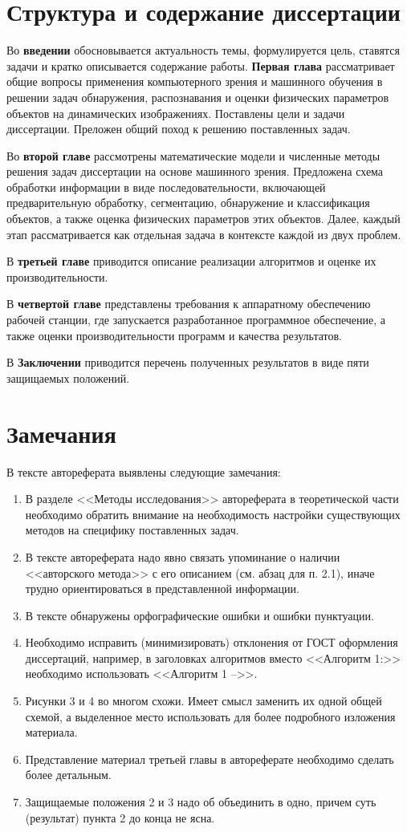 \documentclass[12pt]{extarticle}
\begin{document}
\section{Структура и содержание диссертации}

Во \textbf{введении} обосновывается актуальность темы, формулируется цель, ставятся задачи и кратко описывается содержание работы. \textbf{Первая глава} рассматривает общие вопросы применения компьютерного зрения и машинного обучения в решении задач обнаружения, распознавания и оценки физических параметров объектов на динамических изображениях.  Поставлены цели и задачи диссертации. Преложен общий поход к решению поставленных задач.

Во \textbf{второй главе} рассмотрены математические модели и численные методы решения задач диссертации на основе машинного зрения.  Предложена схема обработки информации в виде последовательности, включающей предварительную обработку, сегментацию, обнаружение и классификация объектов, а также оценка физических параметров этих объектов.  Далее, каждый этап рассматривается как отдельная задача в контексте каждой из двух проблем.

В \textbf{третьей главе} приводится описание реализации алгоритмов и оценке их производительности.

В \textbf{четвертой главе} представлены требования к аппаратному обеспечению рабочей станции, где запускается разработанное программное обеспечение, а также оценки производительности программ и качества результатов.

В \textbf{Заключении} приводится перечень полученных результатов в виде пяти защищаемых положений.

\section{Замечания}
В тексте автореферата выявлены следующие замечания:
\begin{enumerate}
\item В разделе <<Методы исследования>> автореферата в теоретической части необходимо обратить внимание на необходимость настройки существующих методов на специфику поставленных задач.
\item В тексте автореферата надо явно связать упоминание о наличии <<авторского метода>> с его описанием (см. абзац для п. 2.1), иначе трудно ориентироваться в представленной информации.
\item В тексте обнаружены орфографические ошибки и ошибки пунктуации.
\item Необходимо исправить (минимизировать) отклонения от ГОСТ оформления диссертаций, например, в заголовках алгоритмов вместо <<Алгоритм 1:>> необходимо использовать <<Алгоритм 1 -->>.
\item Рисунки 3 и 4 во многом схожи.  Имеет смысл заменить их одной общей схемой, а выделенное место использовать для более подробного изложения материала.
\item Представление материал третьей главы в автореферате необходимо сделать более детальным.
\item Защищаемые положения 2 и 3 надо об объединить в одно, причем суть (результат) пункта 2 до конца не ясна.
\end{enumerate}
\end{document}
